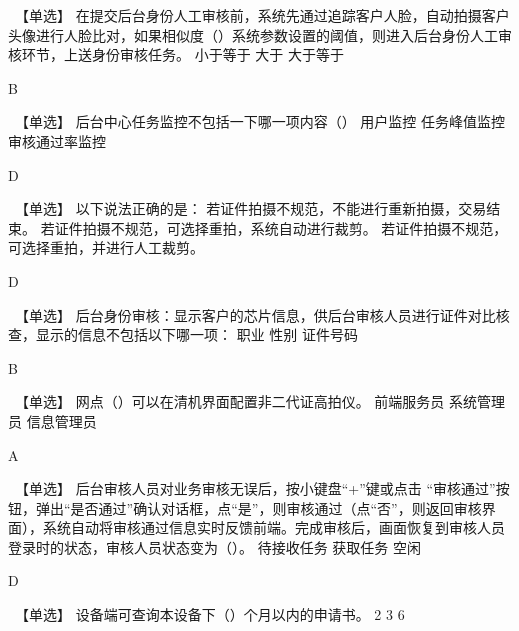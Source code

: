\documentclass[kindlepaper]{BHCexam4kindle}
\begin{document}
\begin{questions}
\qs　【单选】 在提交后台身份人工审核前，系统先通过追踪客户人脸，自动拍摄客户头像进行人脸比对，如果相似度（）系统参数设置的阈值，则进入后台身份人工审核环节，上送身份审核任务。 \xx
{} {  小于等于 } { 大于 } { 大于等于 }
\begin{solution} B \end{solution}
\qs　【单选】 后台中心任务监控不包括一下哪一项内容（） \xx
{} {  用户监控 } { 任务峰值监控 } { 审核通过率监控 }
\begin{solution} D \end{solution}
\qs　【单选】 以下说法正确的是： \xx
{} {  若证件拍摄不规范，不能进行重新拍摄，交易结束。 } { 若证件拍摄不规范，可选择重拍，系统自动进行裁剪。 } { 若证件拍摄不规范，可选择重拍，并进行人工裁剪。 }
\begin{solution} D \end{solution}
\qs　【单选】 后台身份审核：显示客户的芯片信息，供后台审核人员进行证件对比核查，显示的信息不包括以下哪一项： \xx
{} {  职业 } { 性别 } { 证件号码 }
\begin{solution} B \end{solution}
\qs　【单选】 网点（）可以在清机界面配置非二代证高拍仪。 \xx
{} {  前端服务员 } { 系统管理员 } { 信息管理员 }
\begin{solution} A \end{solution}
\qs　【单选】 后台审核人员对业务审核无误后，按小键盘“+”键或点击 “审核通过”按钮，弹出“是否通过”确认对话框，点“是”，则审核通过（点“否”，则返回审核界面），系统自动将审核通过信息实时反馈前端。完成审核后，画面恢复到审核人员登录时的状态，审核人员状态变为（）。 \xx
{} {  待接收任务 } { 获取任务 } { 空闲 }
\begin{solution} D \end{solution}
\qs　【单选】 设备端可查询本设备下（）个月以内的申请书。 \xx
{} {  2 } { 3 } { 6 }

\end{questions}
\end{document}
